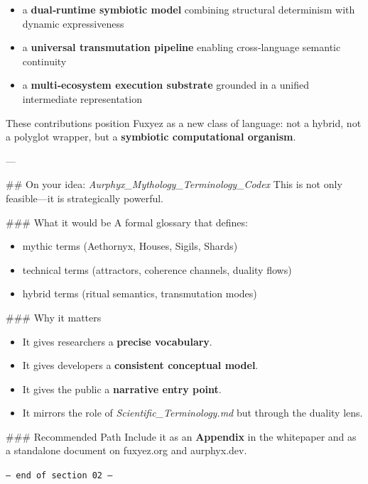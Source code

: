 \documentclass[12pt, a4paper]{book}
\begin{document}
\begin{itemize}
  \item a \textbf{dual‑runtime symbiotic model} combining structural determinism with dynamic expressiveness  
  \item a \textbf{universal transmutation pipeline} enabling cross‑language semantic continuity  
  \item a \textbf{multi‑ecosystem execution substrate} grounded in a unified intermediate representation  
\end{itemize}

These contributions position Fuxyez as a new class of language: not a hybrid, not a polyglot wrapper, but a \textbf{symbiotic computational organism}.

---

\#\# On your idea: \textit{Aurphyx\_Mythology\_Terminology\_Codex}
This is not only feasible—it is strategically powerful.

\#\#\# What it would be  
A formal glossary that defines:

\begin{itemize}
  \item mythic terms (Aethornyx, Houses, Sigils, Shards)  
  \item technical terms (attractors, coherence channels, duality flows)  
  \item hybrid terms (ritual semantics, transmutation modes)  
\end{itemize}

\#\#\# Why it matters  
\begin{itemize}
  \item It gives researchers a \textbf{precise vocabulary}.  
  \item It gives developers a \textbf{consistent conceptual model}.  
  \item It gives the public a \textbf{narrative entry point}.  
  \item It mirrors the role of \textit{Scientific\_Terminology.md} but through the duality lens.  
\end{itemize}

\#\#\# Recommended Path  
Include it as an \textbf{Appendix} in the whitepaper and as a standalone document on fuxyez.org and aurphyx.dev.
    
    \vspace{1cm}
    \begin{center}
    \color{alienPurple}\texttt{--- end of section 02 ---}
    \end{center}
    \clearpage
    
\end{document}
